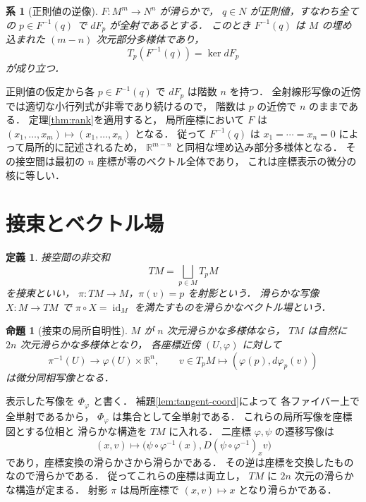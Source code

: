 \documentclass[a5paper,10pt,onecolumn]{jsarticle}
\makeatletter
\theoremstyle{mathnotetheorem}
\newtheorem{definition}[theorem]{定義}
\newtheorem{proposition}[theorem]{命題}
\newtheorem{corollary}[theorem]{系}
\renewcommand{\proofname}{証明}
\renewenvironment{proof}[1][\proofname]{%
  \par\pushQED{\qed}\normalfont\topsep4\p@\@plus2\p@\relax
  \trivlist\item[\hskip\labelsep\bfseries #1]\ignorespaces
}{\popQED\endtrivlist\@endpefalse}
\makeatother
\begin{document}
\begin{corollary}[正則値の逆像]\label{cor:regular-value}
$F:M^m\to N^n$ が滑らかで，
$q\in N$ が正則値，すなわち全ての $p\in F^{-1}(q)$ で
$dF_p$ が全射であるとする．
このとき $F^{-1}(q)$ は
$M$ の埋め込まれた $(m-n)$ 次元部分多様体であり，
\[
 T_p(F^{-1}(q))=\ker dF_p
\]
が成り立つ．
\end{corollary}
\begin{proof}
正則値の仮定から各 $p\in F^{-1}(q)$ で
$dF_p$ は階数 $n$ を持つ．
全射線形写像の近傍では適切な小行列式が非零であり続けるので，
階数は $p$ の近傍で $n$ のままである．
定理\ref{thm:rank}を適用すると，
局所座標において $F$ は
$(x_1,\dots,x_m)\mapsto(x_1,\dots,x_n)$ となる．
従って $F^{-1}(q)$ は
$x_1=\cdots=x_n=0$ によって局所的に記述されるため，
$\mathbb R^{m-n}$ と同相な埋め込み部分多様体となる．
その接空間は最初の $n$ 座標が零のベクトル全体であり，
これは座標表示の微分の核に等しい．
\end{proof}

\section{接束とベクトル場}

\begin{definition}
接空間の非交和
\[
 TM=\bigsqcup_{p\in M}T_pM
\]
を接束といい，
$\pi:TM\to M$，$\pi(v)=p$ を射影という．
滑らかな写像 $X:M\to TM$ で $\pi\circ X=\operatorname{id}_M$
を満たすものを滑らかなベクトル場という．
\end{definition}

\begin{proposition}[接束の局所自明性]\label{prop:tangent-bundle}
$M$ が $n$ 次元滑らかな多様体なら，
$TM$ は自然に $2n$ 次元滑らかな多様体となり，
各座標近傍 $(U,\varphi)$ に対して
\[
 \pi^{-1}(U)\longrightarrow\varphi(U)\times\mathbb R^n,
 \qquad
 v\in T_pM\longmapsto(\varphi(p),d\varphi_p(v))
\]
は微分同相写像となる．
\end{proposition}
\begin{proof}
表示した写像を $\Phi_\varphi$ と書く．
補題\ref{lem:tangent-coord}によって
各ファイバー上で全単射であるから，
$\Phi_\varphi$ は集合として全単射である．
これらの局所写像を座標図とする位相と
滑らかな構造を $TM$ に入れる．
二座標 $\varphi,\psi$ の遷移写像は
\[
 (x,v)\longmapsto
 \bigl(\psi\circ\varphi^{-1}(x),
       D(\psi\circ\varphi^{-1})_xv\bigr)
\]
であり，座標変換の滑らかさから滑らかである．
その逆は座標を交換したものなので滑らかである．
従ってこれらの座標は両立し，
$TM$ に $2n$ 次元の滑らかな構造が定まる．
射影 $\pi$ は局所座標で $(x,v)\mapsto x$ となり滑らかである．
\end{proof}
\end{document}
